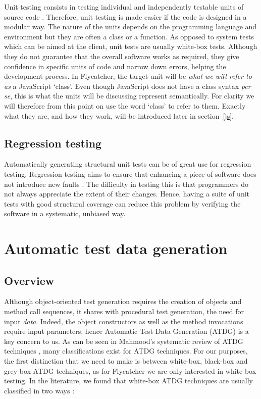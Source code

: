 Unit testing consists in testing individual and independently testable units of source code \cite{myers2011art}. Therefore, unit testing is made easier if the code is designed in a modular way. The nature of the units depends on the programming language and environment but they are often a class or a function. As opposed to system tests which can be aimed at the client, unit tests are usually white-box tests. Although they do not guarantee that the overall software works as required, they give confidence in specific units of code and narrow down errors, helping the development process. In \textsf{Flycatcher}, the target unit will be \emph{what we will refer to as} a JavaScript `class'. Even though JavaScript does not have a class syntax \emph{per se}, this is what the units will be discussing represent semantically. For clarity we will therefore from this point on use the word `class' to refer to them. Exactly what they are, and how they work, will be introduced later in section~\ref{js}.

\subsection{Regression testing}
Automatically generating structural unit tests can be of great use for regression testing. Regression testing aims to ensure that enhancing a piece of software does not introduce new faults \cite{myers2011art}. The difficulty in testing this is that programmers do not always appreciate the extent of their changes. Hence, having a suite of unit tests with good structural coverage can reduce this problem by verifying the software in a systematic, unbiased way.

\section{Automatic test data generation}
\subsection{Overview}

Although object-oriented test generation requires the creation of objects and method call sequences, it shares with procedural test generation, the need for input \emph{data}. Indeed, the object constructors as well as the method invocations require input parameters, hence Automatic Test Data Generation (ATDG) is a key concern to us. As can be seen in Mahmood's systematic review of ATDG techniques \cite{mahmood2007systematic}, many classifications exist for ATDG techniques. For our purposes, the first distinction that we need to make is between white-box, black-box \cite{prasanna2005survey} and grey-box ATDG techniques, as for \textsf{Flycatcher} we are only interested in white-box testing. In the literature, we found that white-box ATDG techniques are usually classified in two ways \cite{mahmood2007systematic, edvardsson1999survey, tahbildar2automated}:

